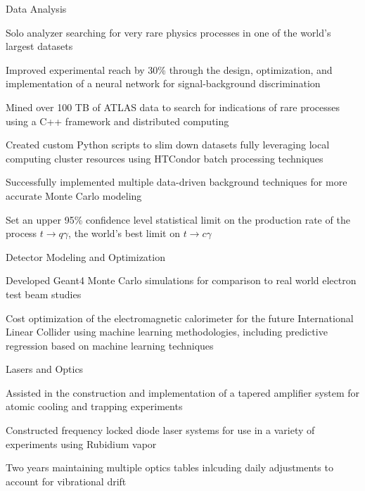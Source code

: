 
\begin{cventries}
  \cventry
    {Data Analysis} %
    {} %
    {} %
    {} %
    {
      \begin{cvitems} %
        \item {Solo analyzer searching for very rare physics processes in one of the world's largest datasets}
        \item {Improved experimental reach by 30\% through the design, optimization, and implementation of a neural network for signal-background discrimination}
        \item {Mined over 100 TB of ATLAS data to search for indications of rare processes using a C++ framework and distributed computing}
         \item{Created custom Python scripts to slim down datasets fully leveraging local computing cluster resources using HTCondor batch processing techniques}
         \item{Successfully implemented multiple data-driven background techniques for more accurate Monte Carlo modeling}
         \item{Set an upper 95\% confidence level statistical limit on the production rate of the process $t\rightarrow q\gamma$, the world's best limit on $t\rightarrow c\gamma$}
         	\end{cvitems}
    } 

    \cventry
    {Detector Modeling and Optimization}
    {}
    {}
    {}
    {
    \begin{cvitems}
    	\item Developed Geant4 Monte Carlo simulations for comparison to real world electron test beam studies
    	\item Cost optimization of the electromagnetic calorimeter for the future International Linear Collider using machine learning methodologies, including predictive regression based on machine learning techniques
    \end{cvitems}
    }
     
    
    \cventry
    {Lasers and Optics} %
    {} %
    {} %
    {} %
    {
      \begin{cvitems} %
        \item {Assisted in the construction and implementation of a tapered amplifier system for atomic cooling and trapping experiments}
        \item {Constructed frequency locked diode laser systems for use in a variety of experiments using Rubidium vapor}
        \item { Two years maintaining multiple optics tables inlcuding daily adjustments to account for vibrational drift}
      \end{cvitems}
    }    
    

\end{cventries}
